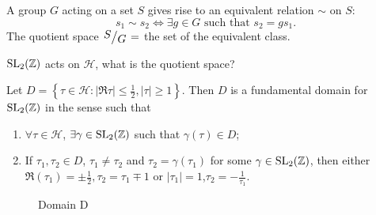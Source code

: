 A group $G$ acting on a set $S$ gives rise to an equivalent relation $\sim$ on $S$:
 \[
s_1\sim s_2 \Leftrightarrow \exists g\in G \text{ such that }s_2=gs_1.
\]
The quotient space $\sfrac{S}{G}=$ the set of the equivalent class.
\begin{question}
  $\operatorname{SL}_2(\mathbb{Z})$ acts on $\mathcal{H}$, what is the quotient space?
\end{question}
\begin{theorem}
  Let $D=\left\{ \tau \in \mathcal{H}:|\Re\tau|\le \frac{1}{2},|\tau|\ge 1 \right\} $. Then $D$ is a fundamental domain for $\operatorname{SL}_2(\mathbb{Z})$ in the sense such that 
  \begin{enumerate}
    \item $\forall \tau \in \mathcal{H}$, $\exists \gamma \in \operatorname{SL}_2(\mathbb{Z})$ such that $\gamma(\tau)\in D$;
    \item If $\tau_1,\tau_2 \in D$, $\tau_1\neq\tau_2$ and $\tau_2=\gamma(\tau_1)$ for some $\gamma \in \operatorname{SL}_2(\mathbb{Z})$, then either $\Re(\tau_1)=\pm \frac{1}{2},\tau_2=\tau_1\mp 1 $ or $|\tau_1|=1$,$\tau_2=-\frac{1}{\tau_1}$.
  \end{enumerate}
\end{theorem}
\begin{figure}[ht]
    \centering
    \caption{Domain D}
    \label{fig:domain-d}
\end{figure}
